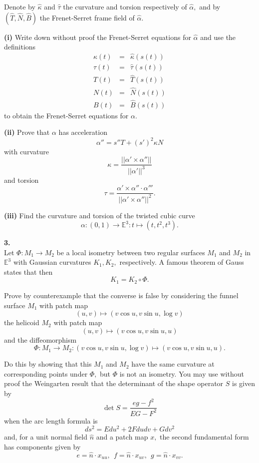 \documentclass[12pt]{article}
\def\E{\mathbb{E}}
\begin{document}
Denote by $\hat{\kappa}$ and
$\hat{\tau}$ the curvature and torsion respectively of $\hat{\alpha},$ and
by $(\hat{T},\hat{N},\hat{B})$ the Frenet-Serret frame field of $\hat{\alpha}.$

{\large\bf (i)} Write down without proof
the Frenet-Serret equations for $\hat{\alpha}$ and use the definitions
\begin{eqnarray*}
\kappa(t) &=& \hat{\kappa}(s(t)) \\
\tau(t) &=& \hat{\tau}(s(t)) \\
T(t) &=& \hat{T}(s(t)) \\
N(t) &=& \hat{N}(s(t)) \\
B(t) &=& \hat{B}(s(t))
\end{eqnarray*}
to obtain the Frenet-Serret equations for $\alpha.$

{\large\bf (ii)} Prove that $\alpha$ has acceleration
$$\alpha'' = s''T+(s')^2\kappa N$$
with curvature
$$\kappa = \frac{||\alpha' \times\alpha''||}{||\alpha'||^3}$$
and torsion
$$\tau = \frac{\alpha' \times\alpha''\cdot \alpha'''}{||\alpha'\times \alpha''||^2}.$$




{\large\bf (iii)} Find the curvature and torsion of the twisted cubic curve
$$\alpha: (0,1) \rightarrow \E^3 : t \mapsto (t,t^2,t^3).$$

\newpage
{\large\bf 3.} \\
Let $\Phi:M_1\rightarrow M_2$ be a local isometry between two
regular surfaces $M_1$ and $M_2$ in $\E^3$ with Gaussian curvatures
$K_1,K_2,$ respectively. A famous theorem of Gauss states
that then
$$K_1=K_2\circ\Phi.$$

Prove by counterexample that the converse is false by considering the funnel
surface $M_1$ with patch map
$$(u,v)\mapsto (v\cos u,v\sin u, \log v)$$
the helicoid $M_2$ with patch map
$$(u,v)\mapsto (v\cos u,v\sin u, u)$$
and the diffeomorphism
$$\Phi:M_1\rightarrow M_2:(v\cos u,v\sin u, \log v)\mapsto (v\cos u,v\sin u, u).$$

Do this by showing that this $M_1$ and $M_2$ have the same curvature at corresponding
points under $\Phi,$ but $\Phi$ is not an isometry.
You may use without proof the Weingarten result that the determinant of the shape
operator $S$ is given by
$$\det S = \frac{eg-f^2}{EG-F^2}$$
when the arc length formula is
$$ds^2=Edu^2+2Fdudv+Gdv^2$$
and, for a unit normal field $\hat{n}$ and a patch map $x,$ the second fundamental form
has components given by
$$e=\hat{n}\cdot x_{uu}, \ \ f=\hat{n}\cdot x_{uv}, \ \ g=\hat{n} \cdot x_{vv}.$$
\end{document}
